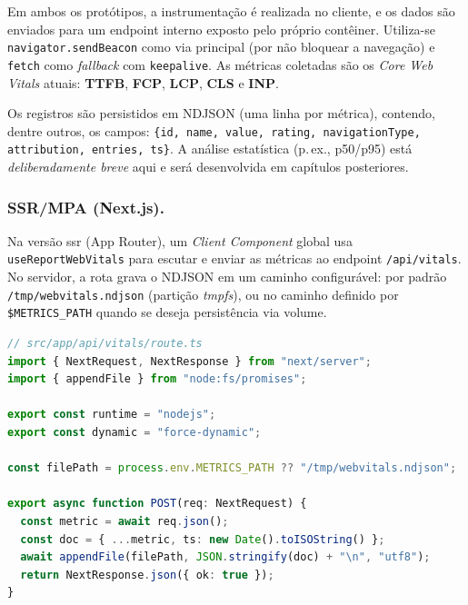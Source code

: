 Em ambos os protótipos, a instrumentação é realizada no cliente, e os dados são enviados para um endpoint interno exposto pelo próprio contêiner. Utiliza-se \texttt{navigator.sendBeacon} como via principal (por não bloquear a navegação) e \texttt{fetch} como \textit{fallback} com \texttt{keepalive}. As métricas coletadas são os \textit{Core Web Vitals} atuais: \textbf{TTFB}, \textbf{FCP}, \textbf{LCP}, \textbf{CLS} e \textbf{INP}.

Os registros são persistidos em NDJSON (uma linha por métrica), contendo, dentre outros, os campos:
\texttt{\{id, name, value, rating, navigationType, attribution, entries, ts\}}. A análise estatística (p.\,ex., p50/p95) está \textit{deliberadamente breve} aqui e será desenvolvida em capítulos posteriores.

\subsubsection{SSR/MPA (Next.js).}
Na versão \acrshort{ssr} (App Router), um \textit{Client Component} global usa \texttt{useReportWebVitals} para escutar e enviar as métricas ao endpoint \texttt{/api/vitals}. No servidor, a rota grava o NDJSON em um caminho configurável: por padrão \texttt{/tmp/webvitals.ndjson} (partição \textit{tmpfs}), ou no caminho definido por \texttt{\$METRICS\_PATH} quando se deseja persistência via volume.

\begin{lstlisting}[language=TypeScript,caption={Endpoint de métricas no SSR/Next.js (visão de servidor)}]
// src/app/api/vitals/route.ts
import { NextRequest, NextResponse } from "next/server";
import { appendFile } from "node:fs/promises";

export const runtime = "nodejs";
export const dynamic = "force-dynamic";

const filePath = process.env.METRICS_PATH ?? "/tmp/webvitals.ndjson";

export async function POST(req: NextRequest) {
  const metric = await req.json();
  const doc = { ...metric, ts: new Date().toISOString() };
  await appendFile(filePath, JSON.stringify(doc) + "\n", "utf8");
  return NextResponse.json({ ok: true });
}
\end{lstlisting}

